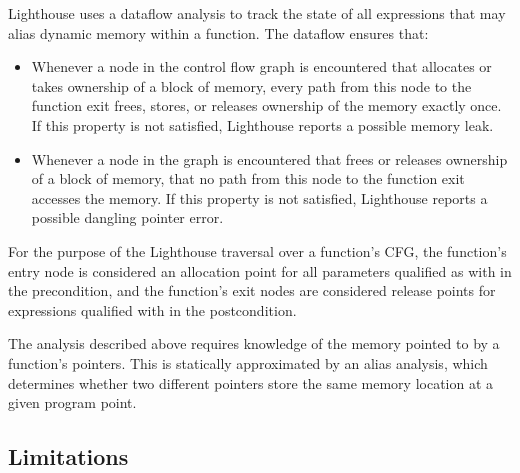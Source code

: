 Lighthouse uses a dataflow analysis to track the state of all expressions that
may alias dynamic memory within a function.
%
The dataflow ensures that:
%
\begin{itemize}
%
\item Whenever a node in the control flow graph is encountered that allocates
or takes ownership of a block of memory, every path from this node to the
function exit frees, stores, or releases ownership of the memory exactly once.  
%
If this property is not satisfied, Lighthouse reports a possible memory leak.
%
\item Whenever a node in the graph is encountered that frees or releases
ownership of a block of memory, that no path from this node to the function
exit accesses the memory.  
%
If this property is not satisfied, Lighthouse reports a possible dangling
pointer error.
%
\end{itemize}
%
For the purpose of the Lighthouse traversal over a function's CFG, the
function's entry node is considered an allocation point for all
parameters qualified as with  in the precondition, and the function's exit
nodes are considered release points for expressions qualified with
 in the postcondition.



The analysis described above requires knowledge of the memory pointed to by
a function's pointers.  
%
This is statically approximated by an alias analysis, which determines
whether two different pointers store the same memory location at a given
program point.  



\subsection{Limitations}



